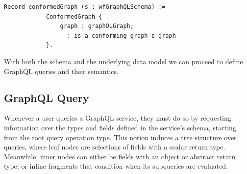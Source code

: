 \begin{verbatim}
Record conformedGraph (s : wfGraphQLSchema) :=
            ConformedGraph {
                graph : graphQLGraph;
                _ : is_a_conforming_graph s graph
            }.
\end{verbatim}


With both the schema and the underlying data model we can proceed to define GraphQL queries and their semantics.

\subsection{GraphQL Query}\label{subsec:query}

Whenever a user queries a GraphQL service, they must do so by requesting information over the types and fields defined in the service's schema, starting from the root query operation type. This notion induces a tree structure over queries, where leaf nodes are selections of fields with a scalar return type. Meanwhile, inner nodes can either be fields with an object or abstract return type, or inline fragments that condition when its subqueries are evaluated. %

